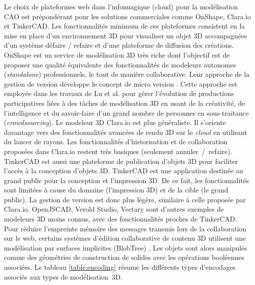 %
Le choix de plateformes web dans l'infonuagique (\og cloud\fg{}) pour la 
modélisation \gls{CAO} est prépondérant pour les solutions commerciales comme 
OnShape, Clara.io et TinkerCAD. Les fonctionnalités minimum de ces plateformes 
consistent en la mise en place d'un environnement \gls{3D} pour visualiser un 
objet \gls{3D} accompagnées d'un système défaire / refaire et d'une plateforme de 
diffusion des créations.
OnShape est un service de modélisation \gls{3D} très riche dont l'objectif est de 
proposer une qualité équivalente des fonctionnalités de modeleurs autonomes 
(\textit{standalone}) professionnels, le tout de manière collaborative. Leur approche 
de la gestion de version développe le concept de micro version \cite{Baran2015}. 
Cette approche est employée dans les travaux de Lu et al. \cite{Lu2016} pour 
gérer l'évolution de productions participatives liées à des tâches de modélisation 
3D en usant de la créativité, de l'intelligence et du savoir-faire 
d'un grand nombre de personnes en sous-traitance (\textit{crowdsourcing}). 
Le modeleur \gls{3D} Clara.io \cite{Houston2013} est plus généraliste. Il s'oriente 
davantage vers des fonctionnalités avancées de rendu \gls{3D} sur le \textit{cloud} 
en 
utilisant du lancer de rayons. 
Les fonctionnalités d'historisation et de collaboration proposées 
dans Clara.io restent très basiques (seulement annuler~/~refaire). TinkerCAD 
est aussi une plateforme de publication d'objets \gls{3D} pour faciliter l'accès à la 
conception d'objets \gls{3D}. 
TinkerCAD est une application destinée au grand 
public pour la conception et l'impression \gls{3D}. De ce fait, les fonctionnalités 
sont 
limitées à cause du domaine (l'impression \gls{3D}) et de la cible (le grand public). 
La gestion 
de version est donc plus légère, similaire à celle proposée par Clara.io. 
OpenJSCAD, Verold Studio, Vectary sont d'autres 
exemples de modeleurs \gls{3D} moins connus, avec des fonctionnalités proches 
de 
TinkerCAD.
Pour réduire l'empreinte mémoire des messages transmis lors de la collaboration 
sur le web, certains systèmes d'édition collaborative de contenu \gls{3D} utilisent 
une 
modélisation par surfaces implicites (BlobTree) \cite{Grasberger2013}. 
Les objets sont alors manipulés comme des géométries de construction de 
solides avec les opérations booléennes associées. Le tableau \ref{table:encoding} 
résume les différents types 
d'encodages associés aux types de modélisation~3D. 

